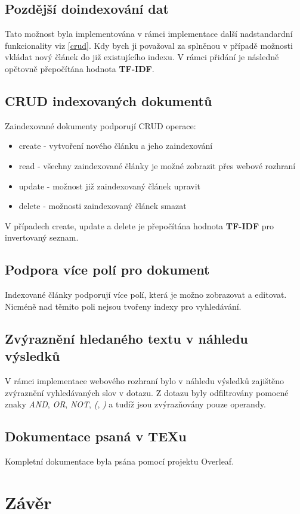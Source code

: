 \documentclass[
12pt,
a4paper,
pdftex,
czech,
titlepage
]{report}
\begin{document}
\section{Pozdější doindexování dat}
Tato možnost byla implementována v rámci implementace další nadstandardní funkcionality viz \ref{crud}. Kdy bych ji považoval za splněnou v případě možnosti vkládat nový článek do již existujícího indexu. V rámci přidání je následně opětovně přepočítána hodnota \textbf{TF-IDF}.
\label{crud}
\section{CRUD indexovaných dokumentů}
Zaindexované dokumenty podporují CRUD operace:
\begin{itemize}
    \item create - vytvoření nového článku a jeho zaindexování
    \item read - všechny zaindexované články je možné zobrazit přes webové rozhraní
    \item update - možnost již zaindexovaný článek upravit
    \item delete - možnosti zaindexovaný článek smazat
\end{itemize}
V případech create, update a delete je přepočítána hodnota \textbf{TF-IDF} pro invertovaný seznam.
\section{Podpora více polí pro dokument}
Indexované články podporují více polí, která je možno zobrazovat a editovat. Nicméně nad těmito poli nejsou tvořeny indexy pro vyhledávání.
\section{Zvýraznění hledaného textu v náhledu výsledků}
V rámci implementace webového rozhraní bylo v náhledu výsledků zajištěno zvýraznění vyhledávaných slov v dotazu. Z dotazu byly odfiltrovány pomocné znaky \textit{AND}, \textit{OR}, \textit{NOT}, \textit{(}, \textit{)} a tudíž jsou zvýrazňovány pouze operandy.
\section{Dokumentace psaná v TEXu}
Kompletní dokumentace byla psána pomocí projektu Overleaf.
\chapter{Závěr}
\end{document}
